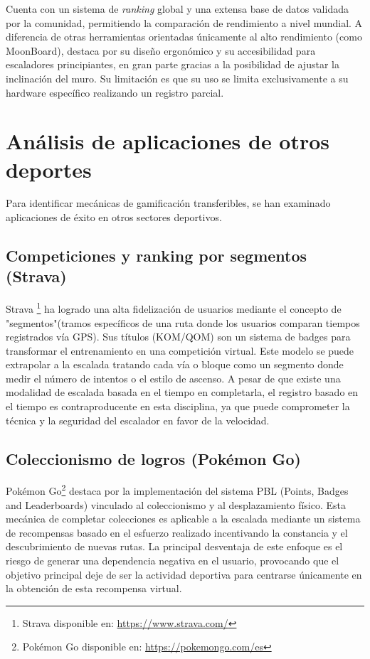 Cuenta con un sistema de \textit{ranking} global y una extensa base de datos validada por la comunidad, permitiendo la comparación de rendimiento a nivel mundial. A diferencia de otras herramientas orientadas únicamente al alto rendimiento (como MoonBoard), destaca por su diseño ergonómico y su accesibilidad para escaladores principiantes, en gran parte gracias a la posibilidad de ajustar la inclinación del muro. Su limitación es que su uso se limita exclusivamente a su hardware específico realizando un registro parcial.

\section{Análisis de aplicaciones de otros deportes}

Para identificar mecánicas de gamificación transferibles, se han examinado aplicaciones de éxito en otros sectores deportivos.

\subsection{Competiciones y ranking por segmentos (Strava)}
Strava \footnote{Strava disponible en: \url{https://www.strava.com/}} ha logrado una alta fidelización de usuarios mediante el concepto de "segmentos"(tramos específicos de una ruta donde los usuarios comparan tiempos registrados vía GPS). Sus títulos (KOM/QOM) son un sistema de badges para transformar el entrenamiento en una competición virtual. Este modelo se puede extrapolar a la escalada tratando cada vía o bloque como un segmento donde medir el número de intentos o el estilo de ascenso. A pesar de que existe una modalidad de escalada basada en el tiempo en completarla, el registro basado en el tiempo es contraproducente en esta disciplina, ya que puede comprometer la técnica y la seguridad del escalador en favor de la velocidad.

\subsection{Coleccionismo de logros (Pokémon Go)}
Pokémon Go\footnote{Pokémon Go disponible en: \url{https://pokemongo.com/es}} destaca por la implementación del sistema PBL (Points, Badges and Leaderboards) vinculado al coleccionismo y al desplazamiento físico. Esta mecánica de completar colecciones es aplicable a la escalada mediante un sistema de recompensas basado en el esfuerzo realizado incentivando la constancia y el descubrimiento de nuevas rutas. La principal desventaja de este enfoque es el riesgo de generar una dependencia negativa en el usuario, provocando que el objetivo principal deje de ser la actividad deportiva para centrarse únicamente en la obtención de esta recompensa virtual.

